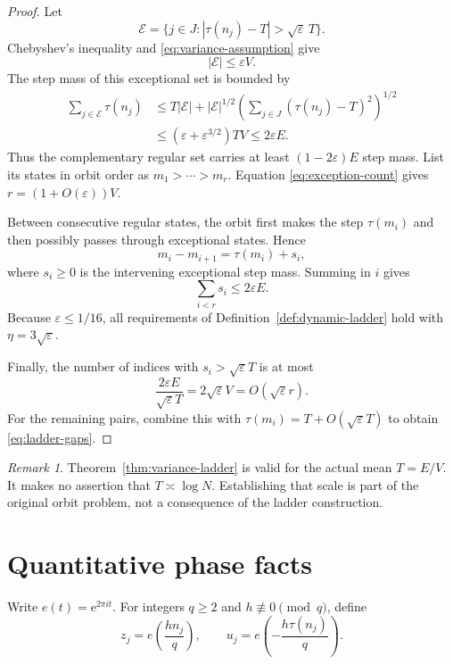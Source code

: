 \documentclass[11pt]{article}
\theoremstyle{definition}
\theoremstyle{remark}
\newtheorem{remark}[theorem]{Remark}
\newcommand{\e}{\mathrm{e}}
\begin{document}
\begin{proof}
Let
\[
 \mathcal E=\{j\in J:|\tau(n_j)-T|>\sqrt\varepsilon\,T\}.
\]
Chebyshev's inequality and \eqref{eq:variance-assumption} give
\begin{equation}\label{eq:exception-count}
 |\mathcal E|\leq\varepsilon V.
\end{equation}
The step mass of this exceptional set is bounded by
\begin{align*}
 \sum_{j\in\mathcal E}\tau(n_j)
 &\leq T|\mathcal E|
 +|\mathcal E|^{1/2}
   \left(\sum_{j\in J}(\tau(n_j)-T)^2\right)^{1/2}\\
 &\leq (\varepsilon+\varepsilon^{3/2})TV
 \leq2\varepsilon E.
\end{align*}
Thus the complementary regular set carries at least $(1-2\varepsilon)E$
step mass.  List its states in orbit order as $m_1>\cdots>m_r$.
Equation \eqref{eq:exception-count} gives
$r=(1+O(\varepsilon))V$.

Between consecutive regular states, the orbit first makes the step
$\tau(m_i)$ and then possibly passes through exceptional states.  Hence
\[
 m_i-m_{i+1}=\tau(m_i)+s_i,
\]
where $s_i\geq0$ is the intervening exceptional step mass.  Summing in
$i$ gives
\[
 \sum_{i<r}s_i\leq2\varepsilon E.
\]
Because $\varepsilon\leq1/16$, all requirements of
Definition~\ref{def:dynamic-ladder} hold with
$\eta=3\sqrt\varepsilon$.

Finally, the number of indices with
$s_i>\sqrt\varepsilon T$ is at most
\[
 \frac{2\varepsilon E}{\sqrt\varepsilon T}
 =2\sqrt\varepsilon V
 =O(\sqrt\varepsilon r).
\]
For the remaining pairs, combine this with
$\tau(m_i)=T+O(\sqrt\varepsilon T)$ to obtain
\eqref{eq:ladder-gaps}.
\end{proof}

\begin{remark}
Theorem~\ref{thm:variance-ladder} is valid for the actual mean $T=E/V$.
It makes no assertion that $T\asymp\log N$.  Establishing that scale is
part of the original orbit problem, not a consequence of the ladder
construction.
\end{remark}

\section{Quantitative phase facts}\label{sec:phase}

Write $e(t)=\e^{2\pi i t}$.  For integers $q\geq2$ and
$h\not\equiv0\pmod q$, define
\[
 z_j=e\!\left(\frac{hn_j}{q}\right),
 \qquad
 u_j=e\!\left(-\frac{h\tau(n_j)}q\right).
\]
\end{document}
